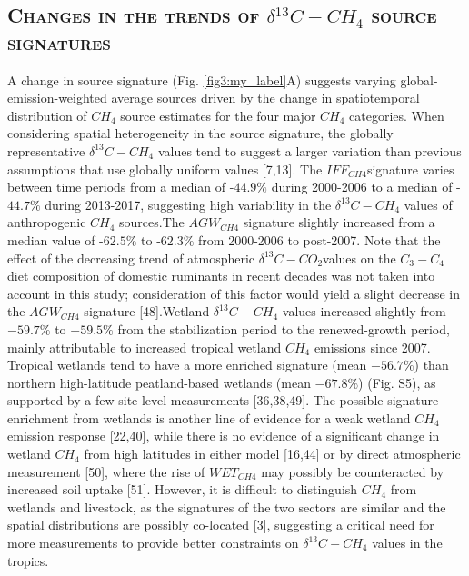 \documentclass[a4paper,12pt]{article}
\begin{document}
\subsection*{\textbf{\textsc{\large{Changes in the trends of $\delta^{13}$$C-CH_{4}$ source signatures}}}}

\small{A change in source signature (Fig. \ref{fig3:my_label}A) suggests varying global-emission-weighted average sources driven by the change in spatiotemporal distribution of $CH_{4}$ source estimates for the four major $CH_{4}$ categories. When considering spatial heterogeneity in the source signature, the globally representative $\delta^{13}$$C-CH_{4}$ values tend to suggest a larger variation than previous assumptions that use globally uniform values [7,13]. The $IFF_{CH4}$signature varies between time periods from a median of -$44.9\%$ during 2000-2006 to a median of -$44.7\%$ during 2013-2017, suggesting high variability in the $\delta^{13}$$C-CH_{4}$ values of anthropogenic $CH_{4}$ sources.The $AGW_{CH4}$ signature slightly increased from a median value of -$62.5\%$ to -$62.3\%$ from 2000-2006 to post-2007. Note that the effect of the decreasing trend of atmospheric $\delta^{13}$$C-CO_{2}$values on the $C_{3}-C_{4}$ diet composition of domestic ruminants in recent decades was not taken into account in this study; consideration of this factor would yield a slight decrease in the $AGW_{CH4}$ signature [48].Wetland $\delta^{13}$$C-CH_{4}$ values increased slightly from $-59.7\%$ to $-59.5\%$ from the stabilization period to the renewed-growth period, mainly attributable to increased tropical wetland $CH_{4}$  emissions since 2007. Tropical wetlands tend to have a more enriched signature (mean $-56.7\%$) than northern high-latitude peatland-based wetlands (mean $-67.8\%$) (Fig. S5), as supported by a few site-level measurements [36,38,49]. The possible signature enrichment from wetlands is another line of evidence for a weak wetland $CH_{4}$ emission response [22,40], while there is no evidence of a significant change in wetland $CH_{4}$ from high latitudes in either model [16,44] or by direct atmospheric measurement [50], where the rise of $WET_{CH4}$ may possibly be counteracted by increased soil uptake [51]. However, it is difficult to distinguish $CH_{4}$ from wetlands and livestock, as the signatures of the two sectors are similar and the spatial distributions are possibly co-located [3], suggesting a critical need for more measurements to provide better constraints on $\delta^{13}$$C-CH_{4}$ values in the tropics.}
\end{document}
